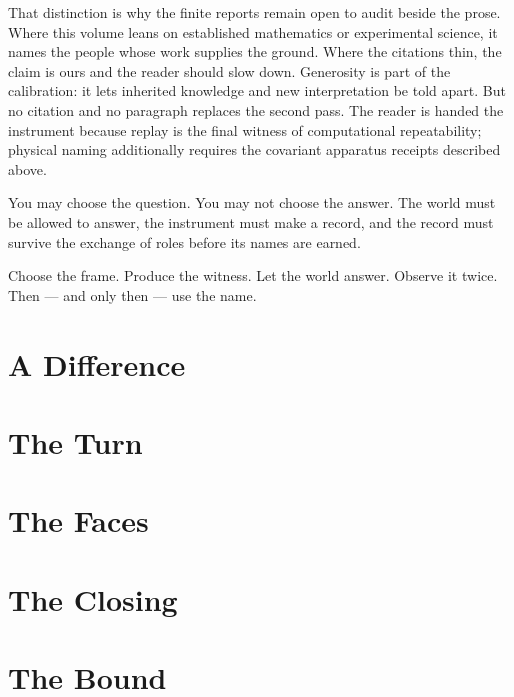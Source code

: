 \documentclass[12pt,oneside]{book}
\begin{document}
That distinction is why the finite reports remain open to audit beside the prose. Where this volume leans on established mathematics or
experimental science, it names the people whose work supplies the ground. Where the citations thin, the claim is ours
and the reader should slow down. Generosity is part of the calibration: it lets inherited knowledge and new
interpretation be told apart. But no citation and no paragraph replaces the second pass. The reader is handed the
instrument because replay is the final witness of computational repeatability; physical naming additionally requires
the covariant apparatus receipts described above.

You may choose the question. You may not choose the answer. The world must be allowed to answer, the instrument must
make a record, and the record must survive the exchange of roles before its names are earned.

Choose the frame. Produce the witness. Let the world answer. Observe it twice. Then --- and only then --- use the name.

\tableofcontents

\mainmatter
\part{A Difference}



\part{The Turn}



\part{The Faces}



\part{The Closing}



\part{The Bound}




\backmatter
\printbibliography
\end{document}
